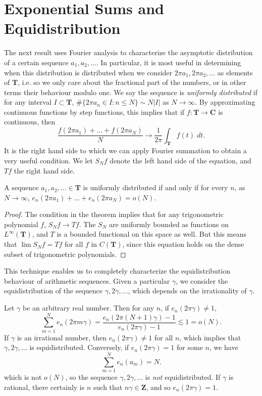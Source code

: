 \section{Exponential Sums and Equidistribution}

The next result uses Fourier analysis to characterize the asymptotic distribution of a certain sequence $a_1, a_2, \dots$. In particular, it is most useful in determining when this distribution is distributed when we consider $2 \pi a_1, 2 \pi a_2, \dots$ as elements of $\mathbf{T}$, i.e. so we only care about the fractional part of the numbers, or in other terms their behaviour modulo one. We say the sequence is {\it uniformly distributed} if for any interval $I \subset \mathbf{T}$, $\# \{ 2 \pi a_n \in I : n \leq N \} \sim N |I|$ as $N \to \infty$. By approximating continuous functions by step functions, this implies that if $f: \mathbf{T} \to \mathbf{C}$ is continuous, then
%
\[ \frac{f(2 \pi a_1) + \dots + f(2 \pi a_N)}{N} \to \frac{1}{2\pi} \int_{\mathbf{T}} f(t)\; dt. \]
%
It is the right hand side to which we can apply Fourier summation to obtain a very useful condition. We let $S_Nf$ denote the left hand side of the equation, and $Tf$ the right hand side.

\begin{theorem}
	A sequence $a_1, a_2, \dots \in \mathbf{T}$ is uniformly distributed if and only if for every $n$, as $N \to \infty$, $e_n(2 \pi a_1) + \dots + e_n(2 \pi a_N) = o(N)$.
\end{theorem}
\begin{proof}
	The condition in the theorem implies that for any trigonometric polynomial $f$, $S_Nf \to Tf$. The $S_N$ are uniformly bounded as functions on $L^\infty(\mathbf{T})$, and $T$ is a bounded functional on this space as well. But this means that $\lim S_N f = T f$ for all $f$ in $C(\mathbf{T})$, since this equation holds on the dense subset of trigonometric polynomials.
\end{proof}

This technique enables us to completely characterize the equidistribution behaviour of arithmetic sequences. Given a particular $\gamma$, we consider the equidistribution of the sequence $\gamma, 2 \gamma, \dots$, which depends on the irrationality of $\gamma$.

\begin{example}
	Let $\gamma$ be an arbitrary real number. Then for any $n$, if $e_n(2 \pi \gamma) \neq 1$,
	\[ \sum_{m = 1}^N e_n(2 \pi m \gamma) = \frac{e_n(2 \pi (N + 1) \gamma) - 1}{e_n(2 \pi \gamma) - 1} \lesssim 1 = o(N). \]
	If $\gamma$ is an irrational number, then $e_n(2 \pi \gamma) \neq 1$ for all $n$, which implies that $\gamma, 2\gamma, \dots$ is equidistributed. Conversely, if $e_n(2 \pi \gamma) = 1$ for some $n$, we have
	\[ \sum_{m = 1}^N e_n(a_m) = N. \]
	which is not $o(N)$, so the sequence $\gamma, 2\gamma, \dots$ is {\it not} equidistributed. If $\gamma$ is rational, there certainly is $n$ such that $n \gamma \in \mathbf{Z}$, and so $e_n(2 \pi \gamma) = 1$.
\end{example}

